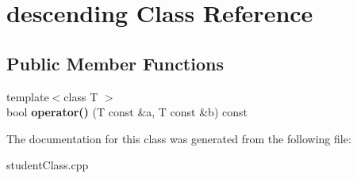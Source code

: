 \hypertarget{classdescending}{}\section{descending Class Reference}
\label{classdescending}
\subsection*{Public Member Functions}
\begin{DoxyCompactItemize}
\item 
\mbox{\label{classdescending_a42f62ce05680b435fb33d83782068f6c}} 
{\footnotesize template$<$class T $>$ }\\bool {\bfseries operator()} (T const \&a, T const \&b) const
\end{DoxyCompactItemize}


The documentation for this class was generated from the following file\+:\begin{DoxyCompactItemize}
\item 
student\+Class.\+cpp\end{DoxyCompactItemize}
